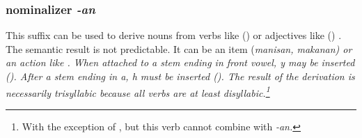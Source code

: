\subsubsection{nominalizer \em -an\em}\label{sec:morph:-an}
This suffix can be used to derive nouns from verbs like  () or adjectives like  () \citep[cf.][28]{Adelaar1991} . The semantic result is not predictable. It can be an item (\em manisan, makanan\em) or an action like . When attached to a stem ending in front  vowel, \em y \em may be inserted (). After a stem ending in \em a\em, \em h \em must be inserted (). The result of the derivation is necessarily trisyllabic because all verbs are at least disyllabic.\footnote{With the exception of , but this verb cannot combine with \em -an\em.}
 
